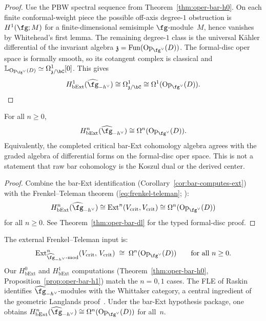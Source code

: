 \begin{proof}
Use the PBW spectral sequence from
Theorem~\ref{thm:oper-bar-h0}.  On each finite conformal-weight
piece the possible off-axis degree-$1$ obstruction is
$H^1(\fg;M)$ for a finite-dimensional semisimple
$\fg$-module~$M$, hence vanishes by Whitehead's first lemma.  The
remaining degree-$1$ class is the universal K\"ahler differential of
the invariant algebra
$\mathfrak z=\mathrm{Fun}(\mathrm{Op}_{\fg^\vee}(D))$.  The
formal-disc oper space is formally smooth, so its cotangent complex
is classical and
$\mathbb L_{\mathrm{Op}_{\fg^\vee}(D)}
\simeq\Omega^1_{\mathfrak z/\bC}[0]$.  This gives
\[
H^1_{\mathrm{bExt}}(\widehat{\fg}_{-h^\vee})
\cong
\Omega^1_{\mathfrak z/\bC}
\cong
\Omega^1(\mathrm{Op}_{\fg^\vee}(D)).
\]
\end{proof}

\begin{theorem}\label{thm:oper-bar}
For all $n \ge 0$,
\begin{equation}\label{eq:bar-derived-oper}
H^n_{\mathrm{bExt}}(\widehat{\fg}_{-h^\vee})
\cong \Omega^n(\mathrm{Op}_{\fg^\vee}(D)).
\end{equation}
Equivalently, the completed critical bar-Ext cohomology algebra agrees
with the graded algebra of differential forms on the formal-disc oper
space. This is not a statement that raw bar cohomology is the Koszul
dual or the derived center.
\end{theorem}

\begin{proof}
Combine the bar-Ext identification
(Corollary~\ref{cor:bar-computes-ext}) with the
Frenkel--Teleman theorem
(\eqref{eq:frenkel-teleman}; \cite{FT06}):
\[
H^n_{\mathrm{bExt}}(\widehat{\fg}_{-h^\vee})
\cong \mathrm{Ext}^n(V_{\mathrm{crit}}, V_{\mathrm{crit}})
\cong \Omega^n(\mathrm{Op}_{\fg^\vee}(D))
\]
for all $n \geq 0$. See
Theorem~\ref{thm:oper-bar-dl} for the typed formal-disc proof.
\end{proof}

\begin{remark}%
\label{rem:frenkel-teleman-oper}
The external Frenkel--Teleman input is:
\begin{equation}\label{eq:frenkel-teleman}
\mathrm{Ext}^n_{\widehat{\fg}_{-h^\vee}\text{-mod}}
(V_{\mathrm{crit}},\, V_{\mathrm{crit}})
\;\cong\; \Omega^n(\mathrm{Op}_{\fg^\vee}(D))
\qquad \text{for all } n \geq 0.
\end{equation}
Our $H^0_{\mathrm{bExt}}$ and $H^1_{\mathrm{bExt}}$ computations
(Theorem~\ref{thm:oper-bar-h0},
Proposition~\ref{prop:oper-bar-h1}) match the $n = 0,1$ cases. The
FLE of Raskin~\cite{Raskin24}
identifies $\widehat{\fg}_{-h^\vee}$-modules with the Whittaker
category, a central ingredient of the geometric Langlands
proof~\cite{GLC24}. Under the bar-Ext hypothesis package, one obtains
$H^n_{\mathrm{bExt}}(\widehat{\fg}_{-h^\vee})
\cong \Omega^n(\mathrm{Op}_{\fg^\vee}(D))$ for all~$n$.
\end{remark}

